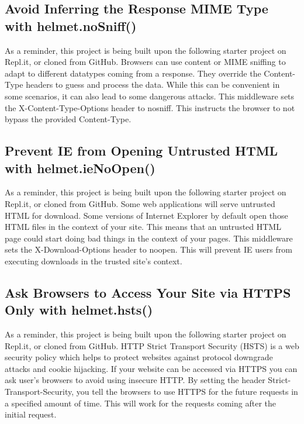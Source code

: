 \documentclass{article}%
\begin{document}
%
\subsection{Avoid Inferring the Response MIME Type with helmet.noSniff()}%
\label{subsec:AvoidInferringtheResponseMIMETypewithhelmet.noSniff()}%
As a reminder, this project is being built upon the following starter project on Repl.it, or cloned from GitHub.\newline%
Browsers can use content or MIME sniffing to adapt to different datatypes coming from a response. They override the Content{-}Type headers to guess and process the data. While this can be convenient in some scenarios, it can also lead to some dangerous attacks. This middleware sets the X{-}Content{-}Type{-}Options header to nosniff. This instructs the browser to not bypass the provided Content{-}Type.\newline%

%
\subsection{Prevent IE from Opening Untrusted HTML with helmet.ieNoOpen()}%
\label{subsec:PreventIEfromOpeningUntrustedHTMLwithhelmet.ieNoOpen()}%
As a reminder, this project is being built upon the following starter project on Repl.it, or cloned from GitHub.\newline%
Some web applications will serve untrusted HTML for download. Some versions of Internet Explorer by default open those HTML files in the context of your site. This means that an untrusted HTML page could start doing bad things in the context of your pages. This middleware sets the X{-}Download{-}Options header to noopen. This will prevent IE users from executing downloads in the trusted site’s context.\newline%

%
\subsection{Ask Browsers to Access Your Site via HTTPS Only with helmet.hsts()}%
\label{subsec:AskBrowserstoAccessYourSiteviaHTTPSOnlywithhelmet.hsts()}%
As a reminder, this project is being built upon the following starter project on Repl.it, or cloned from GitHub.\newline%
HTTP Strict Transport Security (HSTS) is a web security policy which helps to protect websites against protocol downgrade attacks and cookie hijacking. If your website can be accessed via HTTPS you can ask user’s browsers to avoid using insecure HTTP. By setting the header Strict{-}Transport{-}Security, you tell the browsers to use HTTPS for the future requests in a specified amount of time. This will work for the requests coming after the initial request.\newline%
\end{document}
